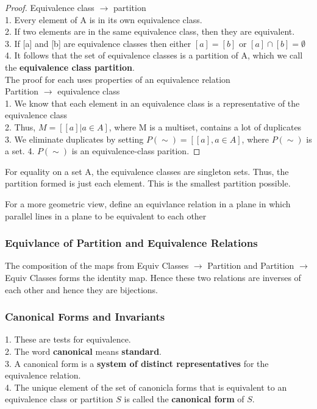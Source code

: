 \documentclass[12pt]{article}
\let\to=\rightarrow
\begin{document}
\begin{proof}
Equivalence class $\to$ partition\\
1. Every element of A is in its own equivalence class.\\
2. If two elements are in the same equivalence class, then they are equivalent.\\
3. If [a]  and [b] are equivalence classes then either $[a] = [b]$ or $[a] \cap [b] = \emptyset$\\
4. It follows that the set of equivalence classes is a partition of A, which we call the \textbf{equivalence class partition}.\\
The proof for each uses properties of an equivalence relation
\\
Partition $\to$ equivalence class\\
1. We know that each element in an equivalence class is a representative of the equivalence class\\
2. Thus, \(M =[[a]| a\in A]\), where M is a multiset, contains a lot of duplicates\\
3. We eliminate duplicates by setting \(P(\sim) =[[a], a \in A]\), where $P(\sim)$ is a set.
4. $P(\sim)$ is an equivalence-class parition.
\end{proof}

For equality on a set A, the equivalence classes are singleton sets. Thus, the partition formed is just each element. This is the smallest partition possible.

For a more geometric view, define an equivlance relation in a plane in which parallel lines in a plane to be equivalent to each other


\subsubsection{Equivlance of Partition and Equivalence Relations}

The composition of the maps from Equiv Classes $\to$ Partition and Partition $\to$ Equiv Classes forms the identity map. Hence these two relations are inverses of each other and hence they are bijections.


\subsubsection{Canonical Forms and Invariants}

1. These are tests for equivalence.\\
2. The word \textbf{canonical} means \textbf{standard}.\\
3. A canonical form is a \textbf{system of distinct representatives} for the equivalence relation.\\
4. The unique element of the set of canonicla forms that is equivalent to an equivalence class or partition $S$ is called the \textbf{canonical form} of $S$. \\
\end{document}
